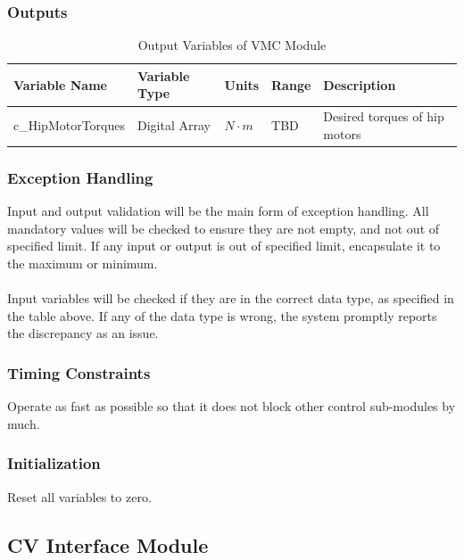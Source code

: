 \documentclass[12pt]{article}
\begin{document}
        \subsubsection{Outputs}
            \begin{table}[H]
              \centering
                \caption{Output Variables of VMC Module} \label{tbl:Output Variables of VMC Module}
                \begin{tabularx}{\textwidth}{|p{5cm}|p{2cm}|p{1.2cm}|p{1cm}|X|}
                \hline Variable Name & Variable Type & Units & Range & Description \\
                \hline c\_HipMotorTorques & Digital Array & $ N \cdot m $ & TBD & Desired torques of hip motors   \\
                \hline 
              \end{tabularx}
            \end{table}  
        
        \subsubsection{Exception Handling}
            Input and output validation will be the main form of exception handling. All mandatory values will be checked to ensure they are not empty, and not out of specified limit. If any input or output is out of specified limit, encapsulate it to the maximum or minimum.\\\\
            Input variables will be checked if they are in the correct data type, as specified in the table above. If any of the data type is wrong, the system promptly reports the discrepancy as an issue.
        \subsubsection{Timing Constraints}
            Operate as fast as possible so that it does not block other control sub-modules by much.
        \subsubsection{Initialization}
            Reset all variables to zero.
    
    \subsection{CV Interface Module}
\end{document}

